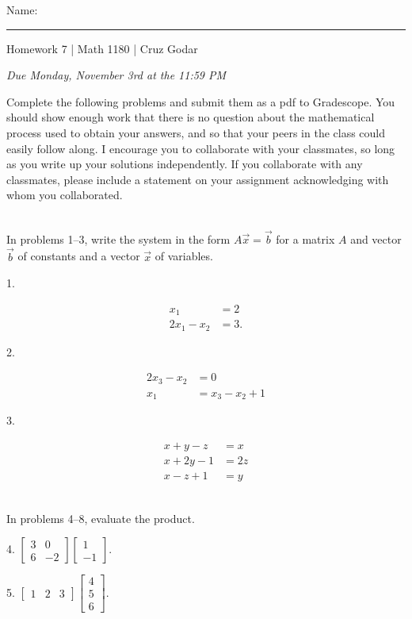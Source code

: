 \documentclass{article}
\begin{document}
\Large Name: \rule{2in}{0.15mm} \hfill Homework 7 | Math 1180 | Cruz Godar \vspace{4pt} \normalsize

\textit{Due Monday, November 3rd at the 11:59 PM}

Complete the following problems and submit them as a pdf to Gradescope. You should show enough work that there is no question about the mathematical process used to obtain your answers, and so that your peers in the class could easily follow along. I encourage you to collaborate with your classmates, so long as you write up your solutions independently. If you collaborate with any classmates, please include a statement on your assignment acknowledging with whom you collaborated.

~\\

In problems 1--3, write the system in the form $A\vec{x} = \vec{b}$ for a matrix $A$ and vector $\vec{b}$ of constants and a vector $\vec{x}$ of variables.

1.

\begin{align*}
	x_1 &= 2\\
	2x_1 - x_2 &= 3.
\end{align*}

2.

\begin{align*}
	2x_3 - x_2 &= 0\\
	x_1 &= x_3 - x_2 + 1
\end{align*}

3.

\begin{align*}
	x + y - z &= x\\
	x + 2y - 1 &= 2z\\
	x - z + 1 &= y
\end{align*}

~\\

In problems 4--8, evaluate the product.

4. $\displaystyle \left[\begin{array}{cc}3& 0 \\ 6& -2\end{array}\right]\left[\begin{array}{c}1 \\ -1\end{array}\right].$

5. $\displaystyle \left[\begin{array}{ccc}1& 2& 3\end{array}\right]\left[\begin{array}{c}4 \\ 5 \\ 6\end{array}\right].$
\end{document}

